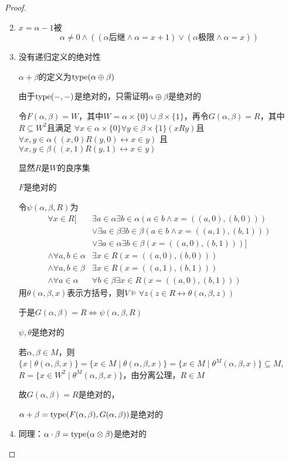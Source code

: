 \documentclass[11pt]{article}
\begin{document}
\begin{proof}
\begin{enumerate}
\setcounter{enumi}{1}
\item \(x=\alpha-1\)被
\begin{equation*}
\alpha\neq 0\wedge((\alpha\text{后继}\wedge\alpha=x+1)\vee(\alpha\text{极限}\wedge\alpha=x))
\end{equation*}
\item 没有递归定义的绝对性

\(\alpha+\beta\)的定义为\(\operatorname{type}(\alpha\oplus\beta)\)

由于\(\operatorname{type}(-,-)\)是绝对的，只需证明\(\alpha\oplus\beta\)是绝对的

令\(F(\alpha,\beta)=W\)，其中\(W=\alpha\times\{0\}\cup\beta\times\{1\}\)，再令\(G(\alpha,\beta)=R\)，其中\(R\subseteq W^2\)且满足
\(\forall x\in\alpha\times\{0\}\forall y\in\beta\times\{1\}(xRy)\)且\(\forall x,y\in\alpha((x,0)R(y,0)\leftrightarrow x\in y)\)
且\(\forall x,y\in\beta((x,1)R(y,1)\leftrightarrow x\in y)\)

显然\(R\)是\(W\)的良序集

\(F\)是绝对的

令\(\psi(\alpha,\beta,R)\)为
\begin{align*}
\forall x\in R[&\exists a\in\alpha\exists b\in\alpha(a\in b\wedge x=((a,0),(b,0)))\\
&\vee\exists a\in\beta\exists b\in\beta(a\in b\wedge x=((a,1),(b,1)))\\
&\vee\exists a\in\alpha\exists b\in\beta(x=((a,0),(b,1)))]\\
\wedge\forall a,b\in\alpha&\exists x\in R(x=((a,0),(b,0)))\\
\wedge\forall a,b\in\beta&\exists x\in R(x=((a,1),(b,1)))\\
\wedge\forall a\in\alpha&\forall b\in\beta\exists x\in R(x=((a,0),(b,1)))
\end{align*}
用\(\theta(\alpha,\beta,x)\)表示方括号，则\(V\vDash\forall z(z\in R\leftrightarrow\theta(\alpha,\beta,z))\)

于是\(G(\alpha,\beta)=R\Leftrightarrow\psi(\alpha,\beta,R)\)

\(\psi,\theta\)是绝对的

若\(\alpha,\beta\in M\)，则\(\{x\mid\theta(\alpha,\beta,x)\}=\{x\in M\mid\theta(\alpha,\beta,x)\}=\{x\in M\mid\theta^M(\alpha,\beta,x)\}\subseteq M\),
\(R=\{x\in W^2\mid\theta^M(\alpha,\beta,x)\}\)，由分离公理，\(R\in M\)

故\(G(\alpha,\beta)=R\)是绝对的，

\(\alpha+\beta=\operatorname{type}(F(\alpha,\beta),G(\alpha,\beta))\)是绝对的
\item 同理：\(\alpha\cdot\beta=\operatorname{type}(\alpha\otimes\beta)\)是绝对的


\end{enumerate}
\end{proof}
\end{document}
